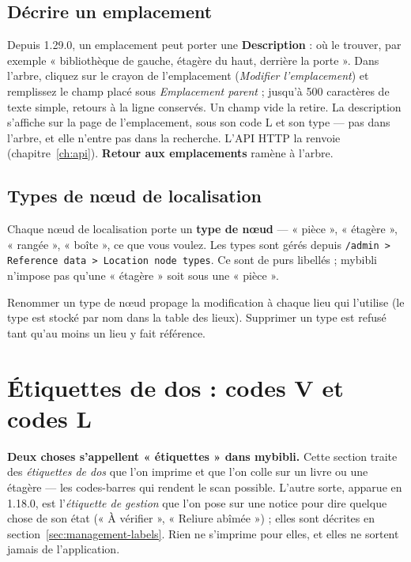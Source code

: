 \subsection*{Décrire un emplacement}
\label{sec:location-description}

Depuis 1.29.0, un emplacement peut porter une \textbf{Description} :
où le trouver, par exemple « bibliothèque de gauche, étagère du haut,
derrière la porte ». Dans l'arbre, cliquez sur le crayon de
l'emplacement (\emph{Modifier l'emplacement}) et remplissez le champ
placé sous \emph{Emplacement parent} ; jusqu'à 500 caractères de texte
simple, retours à la ligne conservés. Un champ vide la retire. La
description s'affiche sur la page de l'emplacement, sous son code L et
son type --- pas dans l'arbre, et elle n'entre pas dans la recherche.
L'API HTTP la renvoie (chapitre~\ref{ch:api}). \textbf{Retour aux
emplacements} ramène à l'arbre.

\subsection*{Types de nœud de localisation}

Chaque nœud de localisation porte un \textbf{type de
nœud} — « pièce », « étagère », « rangée »,
« boîte », ce que vous voulez. Les types sont gérés depuis
\texttt{/admin > Reference data > Location node types}. Ce sont de
purs libellés ; mybibli n'impose pas qu'une « étagère » soit sous
une « pièce ».

\begin{tip}
Renommer un type de nœud propage la modification à chaque lieu qui
l'utilise (le type est stocké par nom dans la table des lieux).
Supprimer un type est refusé tant qu'au moins un lieu y fait
référence.
\end{tip}

\section{Étiquettes de dos : codes V et codes L}\label{sec:labels}

\begin{note}
\textbf{Deux choses s'appellent « étiquettes » dans mybibli.} Cette
section traite des \emph{étiquettes de dos} que l'on imprime et que
l'on colle sur un livre ou une étagère — les codes-barres qui rendent
le scan possible. L'autre sorte, apparue en 1.18.0, est
l'\emph{étiquette de gestion} que l'on pose sur une notice pour dire
quelque chose de son état (« À vérifier », « Reliure abîmée ») ; elles
sont décrites en section~\ref{sec:management-labels}. Rien ne s'imprime
pour elles, et elles ne sortent jamais de l'application.
\end{note}

